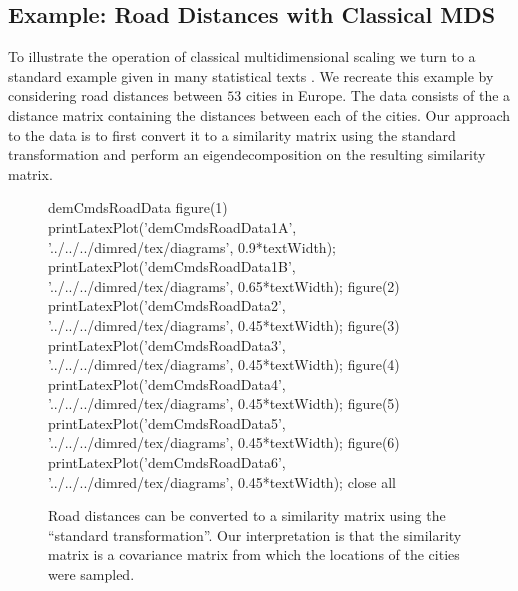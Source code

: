 \subsection{Example: Road Distances with Classical MDS}
\label{sec:roadDistances}
To illustrate the operation of classical multidimensional scaling we
turn to a standard example given in many statistical texts \citet[see
e.g.][]{Mardia:multivariate79}. We recreate this example by
considering road distances between $53$ cities in Europe. The data
consists of the a distance matrix containing the distances between
each of the cities. Our approach to the data is to first convert it to
a similarity matrix using the standard transformation and
perform an eigendecomposition on the resulting similarity matrix.  

\begin{figure}
  \begin{octave}
      demCmdsRoadData
      figure(1)
      printLatexPlot('demCmdsRoadData1A', '../../../dimred/tex/diagrams', 0.9*textWidth);
      printLatexPlot('demCmdsRoadData1B', '../../../dimred/tex/diagrams', 0.65*textWidth);
      figure(2)
      printLatexPlot('demCmdsRoadData2', '../../../dimred/tex/diagrams', 0.45*textWidth);
      figure(3)
      printLatexPlot('demCmdsRoadData3', '../../../dimred/tex/diagrams', 0.45*textWidth);
      figure(4)
      printLatexPlot('demCmdsRoadData4', '../../../dimred/tex/diagrams', 0.45*textWidth);
      figure(5)
      printLatexPlot('demCmdsRoadData5', '../../../dimred/tex/diagrams', 0.45*textWidth);
      figure(6)
      printLatexPlot('demCmdsRoadData6', '../../../dimred/tex/diagrams', 0.45*textWidth);
      close all
  \end{octave}
  \hfill

  \caption{Road distances can be converted to a similarity matrix using
    the ``standard transformation''. Our interpretation is that the
    similarity matrix is a covariance matrix from which the locations of
    the cities were sampled.}

\end{figure}



